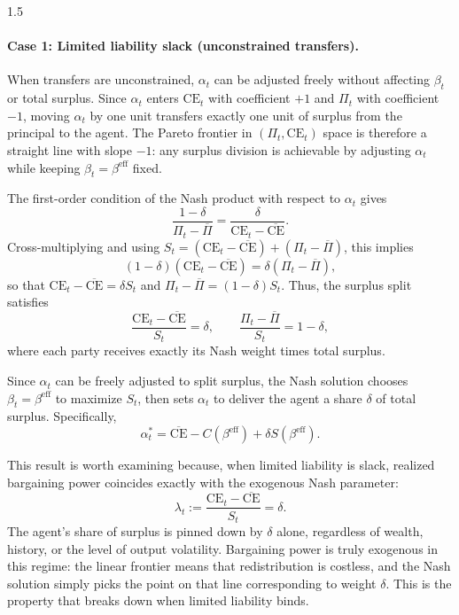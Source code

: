 \documentclass[12pt]{article}
\theoremstyle{definition}
\theoremstyle{plain}
\begin{document}
\begin{spacing}{1.5}
\paragraph{Case 1: Limited liability slack (unconstrained transfers).}

When transfers are unconstrained, $\alpha_t$ can be adjusted freely without affecting $\beta_t$ or total surplus. Since $\alpha_t$ enters $\text{CE}_t$ with coefficient $+1$ and $\Pi_t$ with coefficient $-1$, moving $\alpha_t$ by one unit transfers exactly one unit of surplus from the principal to the agent. The Pareto frontier in $(\Pi_t, \text{CE}_t)$ space is therefore a straight line with slope $-1$: any surplus division is achievable by adjusting $\alpha_t$ while keeping $\beta_t = \beta^{\text{eff}}$ fixed.

The first-order condition of the Nash product with respect to $\alpha_t$ gives
\[
\frac{1-\delta}{\Pi_t - \overline{\Pi}} = \frac{\delta}{\text{CE}_t - \overline{\text{CE}}}.
\]
Cross-multiplying and using $S_t = (\text{CE}_t - \overline{\text{CE}}) + (\Pi_t - \overline{\Pi})$, this implies
\[
(1-\delta)(\text{CE}_t - \overline{\text{CE}}) = \delta(\Pi_t - \overline{\Pi}),
\]
so that $\text{CE}_t - \overline{\text{CE}} = \delta S_t$ and $\Pi_t - \overline{\Pi} = (1-\delta)S_t$. Thus, the surplus split satisfies
\[
\frac{\text{CE}_t - \overline{\text{CE}}}{S_t} = \delta, \qquad \frac{\Pi_t - \overline{\Pi}}{S_t} = 1 - \delta,
\]
where each party receives exactly its Nash weight times total surplus.

Since $\alpha_t$ can be freely adjusted to split surplus, the Nash solution chooses $\beta_t = \beta^{\text{eff}}$ to maximize $S_t$, then sets $\alpha_t$ to deliver the agent a share $\delta$ of total surplus. Specifically,
\[
\alpha_t^* = \overline{\text{CE}} - C(\beta^{\text{eff}}) + \delta S(\beta^{\text{eff}}).
\]

This result is worth examining because, when limited liability is slack, realized bargaining power coincides exactly with the exogenous Nash parameter:
\[
\lambda_t := \frac{\text{CE}_t - \overline{\text{CE}}}{S_t} = \delta.
\]
The agent's share of surplus is pinned down by $\delta$ alone, regardless of wealth, history, or the level of output volatility. Bargaining power is truly exogenous in this regime: the linear frontier means that redistribution is costless, and the Nash solution simply picks the point on that line corresponding to weight $\delta$. This is the property that breaks down when limited liability binds.


\end{spacing}
\end{document}
